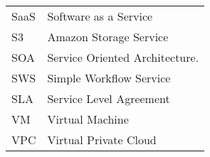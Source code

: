 \begin{table}[h]

\begin{tabularx}{\textwidth}{@{} l X @{}} 
		  SaaS  & Software as a Service \\
		  S3  & Amazon Storage Service  \\
		  SOA  & Service Oriented Architecture. \\
		  SWS  & Simple Workflow Service  \\
		  SLA  & Service Level Agreement  \\
		  VM  & Virtual Machine  \\
  VPC  & Virtual Private Cloud  \\

	

	\end{tabularx}
\end{table} 